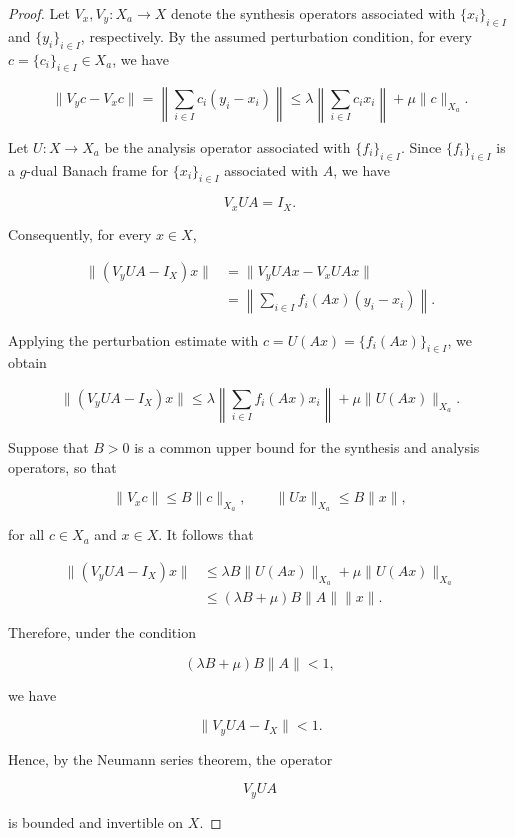 \documentclass[12pt]{article}
\theoremstyle{definition}
\theoremstyle{remark}
\begin{document}
\begin{proof}
	Let \(V_x,V_y:X_a\to X\) denote the synthesis operators associated with
	\(\{x_i\}_{i\in I}\) and \(\{y_i\}_{i\in I}\), respectively. By the
	assumed perturbation condition, for every \(c=\{c_i\}_{i\in I}\in X_a\),
	we have
	
	$$
	\|V_yc-V_xc\|
	=
	\left\|
	\sum_{i\in I}c_i(y_i-x_i)
	\right\|
	\leq
	\lambda
	\left\|
	\sum_{i\in I}c_i x_i
	\right\|
	+\mu\|c\|_{X_a}.
	$$
	
	Let \(U:X\to X_a\) be the analysis operator associated with
	\(\{f_i\}_{i\in I}\). Since \(\{f_i\}_{i\in I}\) is a \(g\)-dual Banach
	frame for \(\{x_i\}_{i\in I}\) associated with \(A\), we have
	
	$$
	V_xUA=I_X.
	$$
	
	Consequently, for every \(x\in X\),
	
	$$
	\begin{aligned}
		\|(V_yUA-I_X)x\|
		&=\|V_yUAx-V_xUAx\|\\
		&=
		\left\|
		\sum_{i\in I}f_i(Ax)(y_i-x_i)
		\right\|.
	\end{aligned}
	$$
	
	Applying the perturbation estimate with
	\(c=U(Ax)=\{f_i(Ax)\}_{i\in I}\), we obtain
	
	$$
	\|(V_yUA-I_X)x\|
	\leq
	\lambda
	\left\|
	\sum_{i\in I}f_i(Ax)x_i
	\right\|
	+\mu\|U(Ax)\|_{X_a}.
	$$
	
	Suppose that \(B>0\) is a common upper bound for the synthesis and
	analysis operators, so that
	
	$$
	\|V_xc\|\leq B\|c\|_{X_a},
	\qquad
	\|U x\|_{X_a}\leq B\|x\|,
	$$
	
	for all \(c\in X_a\) and \(x\in X\). It follows that
	
	$$
	\begin{aligned}
		\|(V_yUA-I_X)x\|
		&\leq
		\lambda B\|U(Ax)\|_{X_a}
		+\mu\|U(Ax)\|_{X_a}\\
		&\leq
		(\lambda B+\mu)B\|A\|\|x\|.
	\end{aligned}
	$$
	
	Therefore, under the condition
	
	$$
	(\lambda B+\mu)B\|A\|<1,
	$$
	
	we have
	
	$$
	\|V_yUA-I_X\|<1.
	$$
	
	Hence, by the Neumann series theorem, the operator
	
	$$
	V_yUA
	$$
	
	is bounded and invertible on \(X\).
	

\end{proof}
\end{document}
